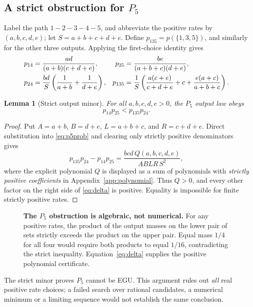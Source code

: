 \documentclass[11pt,a4paper]{article}
\newtheorem{lemma}{Lemma}
\begin{document}
\subsection{A strict obstruction for $P_5$}
Label the path $1-2-3-4-5$, and abbreviate the positive rates by $(a,b,c,d,e)$; let $S=a+b+c+d+e$.  Define $p_{135}=p(\{1,3,5\})$, and similarly for the other three outputs.  Applying the first-choice identity gives
\begin{align}\label{eq:p5prob}
p_{14}&=\frac{ad}{(a+b)(c+d+e)}, &p_{25}&=\frac{be}{(a+b+c)(d+e)},\\
p_{24}&=\frac{bd}{S}\left(\frac1{a+b}+\frac1{d+e}\right), &
p_{135}&=\frac1S\left(\frac{a(c+e)}{c+d+e}+c+\frac{e(a+c)}{a+b+c}\right).\notag
\end{align}

\begin{lemma}[Strict output minor]\label{lem:strict}
For all $a,b,c,d,e>0$, the $P_5$ output law obeys
\begin{equation}\label{eq:minor}p_{14}p_{25}<p_{135}p_{24}.\end{equation}
\end{lemma}
\begin{proof}
Put $A=a+b$, $B=d+e$, $L=a+b+c$, and $R=c+d+e$.  Direct substitution into \eqref{eq:p5prob} and clearing only strictly positive denominators gives
\begin{equation}\label{eq:delta}
p_{135}p_{24}-p_{14}p_{25}=\frac{bcd\,Q(a,b,c,d,e)}{ABLR\,S^2},
\end{equation}
where the explicit polynomial $Q$ is displayed as a sum of polynomials with \emph{strictly positive coefficients} in Appendix~\ref{app:polynomial}.  Thus $Q>0$, and every other factor on the right side of \eqref{eq:delta} is positive.  Equality is impossible for finite strictly positive rates.
\end{proof}

\begin{figure}[htbp]\centering\figobstruction
\caption{\textbf{The $P_5$ obstruction is algebraic, not numerical.}  For any positive rates, the product of the output masses on the lower pair of sets strictly exceeds the product on the upper pair.  Equal mass $1/4$ for all four would require both products to equal $1/16$, contradicting the strict inequality.  Equation~\eqref{eq:delta} supplies the positive polynomial certificate.}\label{fig:obstruction}\end{figure}

The strict minor proves $P_5$ cannot be EGU.  This argument rules out \emph{all} real positive rate choices; a failed search over rational candidates, a numerical minimum or a limiting sequence would not establish the same conclusion.
\end{document}
